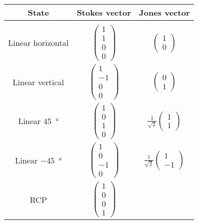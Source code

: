 \documentclass{article}
\begin{document}
    \begin{tabular}{c c c}
        \toprule
        State & Stokes vector & Jones vector \\ 
        \midrule\\
        \addlinespace[-2ex]
        Linear horizontal & 
        $\begin{pmatrix} 1 \\ 1 \\ 0 \\ 0 \end{pmatrix}$ & 
        $\begin{pmatrix} 1 \\ 0 \end{pmatrix}$  \\
        \addlinespace[1.5ex]
        Linear vertical & 
        $\begin{pmatrix} 1 \\ -1 \\ 0 \\ 0 \end{pmatrix}$ & 
        $\begin{pmatrix} 0 \\ 1 \end{pmatrix}$  \\
        \addlinespace[1.5ex]
        Linear \SI{+45}{\degree} & 
        $\begin{pmatrix} 1 \\ 0 \\ 1 \\ 0 \end{pmatrix}$ & 
        $\frac{1}{\sqrt{2}}\begin{pmatrix} 1 \\ 1 \end{pmatrix}$  \\
        \addlinespace[1.5ex]
        Linear \SI{-45}{\degree} & 
        $\begin{pmatrix} 1 \\ 0 \\ -1 \\ 0 \end{pmatrix}$ & 
        $\frac{1}{\sqrt{2}}\begin{pmatrix} 1 \\ -1 \end{pmatrix}$  \\
        \addlinespace[1.5ex]
        RCP & 
        $\begin{pmatrix} 1 \\ 0 \\ 0 \\ 1 \end{pmatrix}$ & 

\end{tabular}
\end{document}
